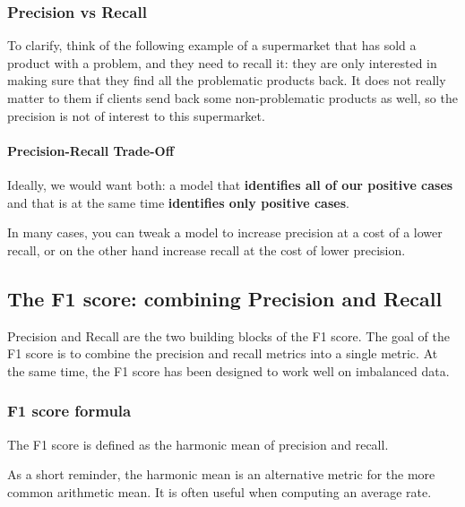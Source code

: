 \hypertarget{precision-vs-recall}{%
\subsubsection{Precision vs Recall}\label{precision-vs-recall}}

To clarify, think of the following example of a supermarket that has
sold a product with a problem, and they need to recall it: they are only
interested in making sure that they find all the problematic products
back. It does not really matter to them if clients send back some
non-problematic products as well, so the precision is not of interest to
this supermarket.

\hypertarget{precision-recall-trade-off}{%
\paragraph{Precision-Recall
Trade-Off}\label{precision-recall-trade-off}}

Ideally, we would want both: a model that \textbf{identifies all of our
positive cases} and that is at the same time \textbf{identifies only
positive cases}.

In many cases, you can tweak a model to increase precision at a cost of
a lower recall, or on the other hand increase recall at the cost of
lower precision.

\hypertarget{the-f1-score-combining-precision-and-recall}{%
\subsection{The F1 score: combining Precision and
Recall}\label{the-f1-score-combining-precision-and-recall}}

Precision and Recall are the two building blocks of the F1 score. The
goal of the F1 score is to combine the precision and recall metrics into
a single metric. At the same time, the F1 score has been designed to
work well on imbalanced data.

\hypertarget{f1-score-formula}{%
\subsubsection{F1 score formula}\label{f1-score-formula}}

The F1 score is defined as the harmonic mean of precision and recall.

As a short reminder, the harmonic mean is an alternative metric for the
more common arithmetic mean. It is often useful when computing an
average rate.

